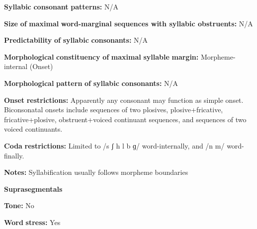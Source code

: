\documentclass[output=paper]{langsci/langscibook}
\begin{document}
\begin{styleBody}
\textbf{Syllabic} \textbf{consonant} \textbf{patterns:} N/A
\end{styleBody}

\begin{styleBody}
\textbf{Size} \textbf{of} \textbf{maximal} \textbf{word{}-marginal sequences with syllabic obstruents:} N/A
\end{styleBody}

\begin{styleBody}
\textbf{Predictability} \textbf{of} \textbf{syllabic} \textbf{consonants:} N/A
\end{styleBody}

\begin{styleBody}
\textbf{Morphological} \textbf{constituency} \textbf{of} \textbf{maximal} \textbf{syllable} \textbf{margin:} Morpheme-internal (Onset)
\end{styleBody}

\begin{styleBody}
\textbf{Morphological} \textbf{pattern} \textbf{of} \textbf{syllabic} \textbf{consonants:} N/A
\end{styleBody}

\begin{styleBody}
\textbf{Onset} \textbf{restrictions:} Apparently any consonant may function as simple onset. Biconsonatal onsets include sequences of two plosives, plosive+fricative, fricative+plosive, obstruent+voiced continuant sequences, and sequences of two voiced continuants.
\end{styleBody}

\begin{styleBody}
\textbf{Coda} \textbf{restrictions:} Limited to /s ʃ h l b ɡ/ word-internally, and /n m/ word-finally.
\end{styleBody}

\begin{styleBody}
\textbf{Notes:} Syllabification usually follows morpheme boundaries
\end{styleBody}

\begin{styleBody}
\textbf{Suprasegmentals}
\end{styleBody}

\begin{styleBody}
\textbf{Tone:} No
\end{styleBody}

\begin{styleBody}
\textbf{Word} \textbf{stress:} Yes
\end{styleBody}
\end{document}

